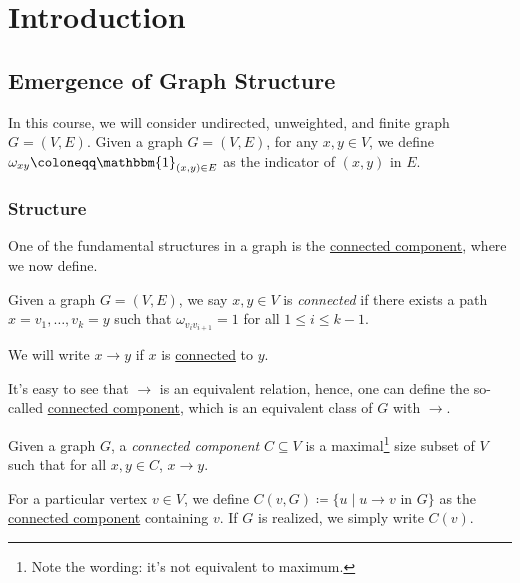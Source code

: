 \chapter{Introduction}

\section{Emergence of Graph Structure}
In this course, we will consider undirected, unweighted, and finite graph \(G = (V, E)\). Given a graph \(G = (V, E)\), for any \(x, y \in V\), we define \(\omega _{xy} \coloneqq \mathbbm{1}_{(x, y) \in E} \) as the indicator of \((x, y)\) in \(E\).

\subsection{Structure}
One of the fundamental structures in a graph is the \hyperref[def:connected-component]{connected component}, where we now define.

\begin{definition}[Connected]\label{def:connected}
	Given a graph \(G = (V, E)\), we say \(x, y \in V\) is \emph{connected} if there exists a path \(x = v_1, \dots, v_k = y\) such that \(\omega _{v_i v_{i+1}} = 1\) for all \(1 \leq i \leq k-1\).
\end{definition}

\begin{notation}
	We will write \(x \to y\) if \(x\) is \hyperref[def:connected]{connected} to \(y\).
\end{notation}

It's easy to see that \(\to \) is an equivalent relation, hence, one can define the so-called \hyperref[def:connected-component]{connected component}, which is an equivalent class of \(G\) with \(\to \).

\begin{definition}\label{def:connected-component}
	Given a graph \(G\), a \emph{connected component} \(C \subseteq V\) is a maximal\footnote{Note the wording: it's not equivalent to maximum.} size subset of \(V\) such that for all \(x, y \in C\), \(x \to y\).
\end{definition}

\begin{notation}
	For a particular vertex \(v \in V\), we define \(C(v, G) \coloneqq \{ u \mid u \to v \text{ in } G\} \) as the \hyperref[def:connected-component]{connected component} containing \(v\). If \(G\) is realized, we simply write \(C(v)\).
\end{notation}

